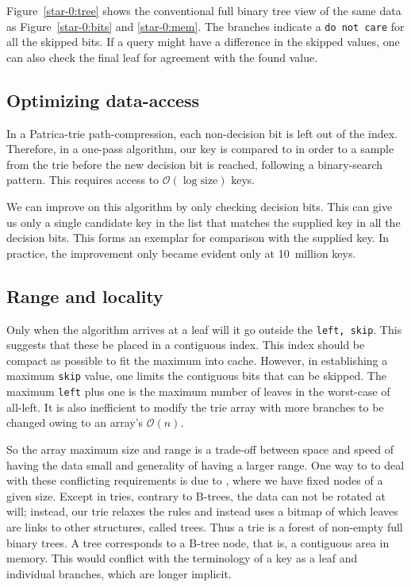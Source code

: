 \documentclass[12pt]{article}
\newcommand{\code}[1]{\colorbox{light-gray}{\texttt{#1}}}
\begin{document}
Figure~\ref{star-0:tree} shows the conventional full binary tree view of the same data as Figure~\ref{star-0:bits} and \ref{star-0:mem}. The branches indicate a \code{do not care} for all the skipped bits. If a query might have a difference in the skipped values, one can also check the final leaf for agreement with the found value.


\subsection{Optimizing data-access}

In a Patrica-trie\cite{morrison1968patricia} path-compression, each non-decision bit is left out of the index. Therefore, in a one-pass algorithm, our key is compared to in order to a sample from the trie before the new decision bit is reached, following a binary-search pattern. This requires access to $\mathcal{O}(\log \text{size})$ keys.

We can improve on this algorithm by only checking decision bits. This can give us only a single candidate key in the list that matches the supplied key in all the decision bits. This forms an exemplar for comparison with the supplied key. In practice, the improvement only became evident only at 10~million keys.

\subsection{Range and locality}

Only when the algorithm arrives at a leaf will it go outside the \code{left, skip}. This suggests that these be placed in a contiguous index. This index should be compact as possible to fit the maximum into cache. However, in establishing a maximum \code{skip} value, one limits the contiguous bits that can be skipped. The maximum \code{left} plus one is the maximum number of leaves in the worst-case of all-left. It is also inefficient to modify the trie array with more branches to be changed owing to an array's $\mathcal{O}(n)$.

So the array maximum size and range is a trade-off between space and speed of having the data small and generality of having a larger range. One way to to deal with these conflicting requirements is due to \cite{bayer1972organization}, where we have fixed nodes of a given size. Except in tries, contrary to B-trees, the data can not be rotated at will; instead, our trie relaxes the rules and instead uses a bitmap of which leaves are links to other structures, called trees. Thus a trie is a forest of non-empty full binary trees. A tree corresponds to a B-tree node\cite{knuth1997sorting}, that is, a contiguous area in memory. This would conflict with the terminology of a key as a leaf and individual branches, which are longer implicit.
\end{document}
